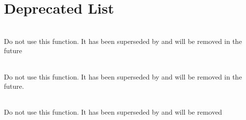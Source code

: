 \chapter{Deprecated List }
\hypertarget{deprecated}{}\label{deprecated}

\begin{DoxyRefList}
\item[{\parbox[t]{\linewidth}{Global \doxylink{group___complex_f_f_t_deprecated_ga80d8fa1e75ce83dd99974d15032f9ce1}{arm\+\_\+cfft\+\_\+radix2\+\_\+f32} (const \doxylink{structarm__cfft__radix2__instance__f32}{arm\+\_\+cfft\+\_\+radix2\+\_\+instance\+\_\+f32} \texorpdfstring{$\ast$}{*}S, \doxylink{group__generic_types_ga4611b605e45ab401f02cab15c5e38715}{float32\+\_\+t} \texorpdfstring{$\ast$}{*}p\+Src)}}]\hfill \\
\label{deprecated__deprecated000004}%
%
Do not use this function. It has been superseded by  and will be removed in the future  
\item[{\parbox[t]{\linewidth}{Global \doxylink{group___complex_f_f_t_deprecated_gac17f704cc9d3ea618eab1fe116bcf6b2}{arm\+\_\+cfft\+\_\+radix2\+\_\+init\+\_\+f32} (\doxylink{structarm__cfft__radix2__instance__f32}{arm\+\_\+cfft\+\_\+radix2\+\_\+instance\+\_\+f32} \texorpdfstring{$\ast$}{*}S, uint16\+\_\+t fft\+Len, uint8\+\_\+t ifft\+Flag, uint8\+\_\+t bit\+Reverse\+Flag)}}]\hfill \\
\label{deprecated__deprecated000006}%
%
Do not use this function. It has been superseded by  and will be removed in the future.  
\item[{\parbox[t]{\linewidth}{Global \doxylink{group___complex_f_f_t_deprecated_ga653a4b8e0b3b25194ec42c5f2dde5942}{arm\+\_\+cfft\+\_\+radix2\+\_\+init\+\_\+q15} (\doxylink{structarm__cfft__radix2__instance__q15}{arm\+\_\+cfft\+\_\+radix2\+\_\+instance\+\_\+q15} \texorpdfstring{$\ast$}{*}S, uint16\+\_\+t fft\+Len, uint8\+\_\+t ifft\+Flag, uint8\+\_\+t bit\+Reverse\+Flag)}}]\hfill \\
\label{deprecated__deprecated000007}%
%
Do not use this function. It has been superseded by  and will be removed  
\item[{\parbox[t]{\linewidth}{Global \doxylink{group___complex_f_f_t_deprecated_gaeb24f3ff002fc8b965db0ea095a0a148}{arm\+\_\+cfft\+\_\+radix2\+\_\+init\+\_\+q31} (\doxylink{structarm__cfft__radix2__instance__q31}{arm\+\_\+cfft\+\_\+radix2\+\_\+instance\+\_\+q31} \texorpdfstring{$\ast$}{*}S, uint16\+\_\+t fft\+Len, uint8\+\_\+t ifft\+Flag, uint8\+\_\+t bit\+Reverse\+Flag)}}]\hfill \\

\end{DoxyRefList}
